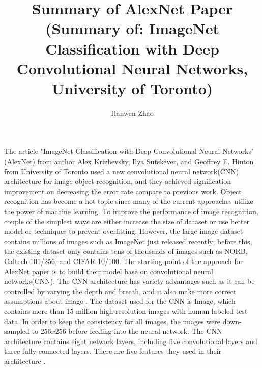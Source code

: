\documentclass[12pt]{article}
\begin{document}
\title{Summary of AlexNet Paper\\
 \small (Summary of: ImageNet Classification with Deep Convolutional Neural Networks, University of Toronto)}
  
\author{Hanwen Zhao}
\date{}

\maketitle
\noindent
The article "ImageNet Classification with Deep Convolutional Neural Networks"(AlexNet) from author Alex Krizhevsky, Ilya Sutskever, and Geoffrey E. Hinton from University of Toronto used a new convolutional neural network(CNN) architecture for image object recognition, and they achieved signification improvement on decreasing the error rate compare to previous work.
\bigbreak
\noindent
Object recognition has become a hot topic since many of the current approaches utilize the power of machine learning. To improve the performance of image recognition, couple of the simplest ways are either increase the size of dataset or use better model or techniques to prevent overfitting. However, the large image dataset contains millions of images such as ImageNet just released recently; before this, the existing dataset only contains tens of thousands of images such as NORB, Caltech-101/256, and CIFAR-10/100\citep{alexnet}.
\bigbreak
\noindent
The starting point of the approach for AlexNet paper is to build their model base on convolutional neural networks(CNN). The CNN architecture has variety advantages such as it can be controlled by varying the depth and breath, and it also make more correct assumptions about image \citep{alexnet}. The dataset used for the CNN is Image, which contains more than 15 million high-resolution images with human labeled test data. In order to keep the consistency for all images, the images were down-sampled to $256 x 256$ before feeding into the neural network. The CNN architecture contains eight network layers, including five convolutional layers and three fully-connected layers. There are five features they used in their architecture \citep{alexnet}.
\end{document}
